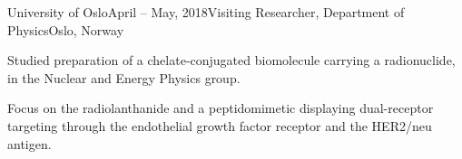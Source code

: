 % 
% 

\begin{rSubsection}{University of Oslo}{April -- May,  2018}{Visiting Researcher, Department of Physics}{Oslo, Norway}
\item    Studied preparation of a chelate-conjugated biomolecule carrying a radionuclide, in the Nuclear and Energy Physics group. 
\item    Focus on the radiolanthanide  and a peptidomimetic displaying dual-receptor targeting through the endothelial growth factor receptor and the HER2/neu antigen.
\end{rSubsection}
% 
% 



